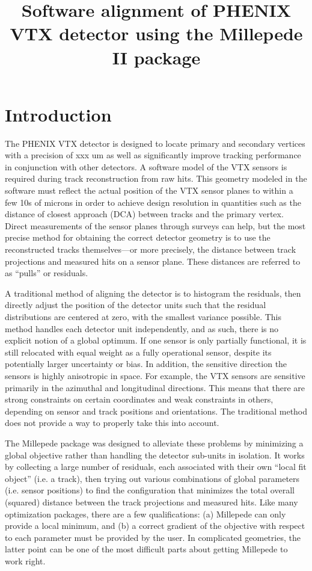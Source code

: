 \documentclass[12pt]{article}
\title{\sffamily\bfseries{Software alignment of PHENIX VTX detector using the Millepede II package}}
\author{\sffamily{Andrew Adare, Darren McGlinchey, Jin Huang}}
\date{\sffamily{\today}}
\begin{document}
\maketitle
\section{Introduction}
The PHENIX VTX detector is designed to locate primary and secondary vertices with a precision of xxx um as well as significantly improve tracking performance in conjunction with other detectors. A software model of the VTX sensors is required during track reconstruction from raw hits. This geometry modeled in the software must reflect the actual position of the VTX sensor planes to within a few 10s of microns in order to achieve design resolution in quantities such as the distance of closest approach (DCA) between tracks and the primary vertex. Direct measurements of the sensor planes through surveys can help, but the most precise method for obtaining the correct detector geometry is to use the reconstructed tracks themselves---or more precisely, the distance between track projections and measured hits on a sensor plane. These distances are referred to as ``pulls'' or residuals.

A traditional method of aligning the detector is to histogram the residuals, then directly adjust the position of the detector units such that the residual distributions are centered at zero, with the smallest variance possible. This method handles each detector unit independently, and as such, there is no explicit notion of a global optimum. If one sensor is only partially functional, it is still relocated with equal weight as a fully operational sensor, despite its potentially larger uncertainty or bias. In addition, the sensitive direction the sensors is highly anisotropic in space. For example, the VTX sensors are sensitive primarily in the azimuthal and longitudinal directions. This means that there are strong constraints on certain coordinates and weak constraints in others, depending on sensor and track positions and orientations. The traditional method does not provide a way to properly take this into account.

The Millepede package was designed to alleviate these problems by minimizing a global objective rather than handling the detector sub-units in isolation. It works by collecting a large number of residuals, each associated with their own ``local fit object'' (i.e. a track), then trying out various combinations of global parameters (i.e. sensor positions) to find the configuration that minimizes the total overall (squared) distance between the track projections and measured hits. Like many optimization packages, there are a few qualifications: (a) Millepede can only provide a local minimum, and (b) a correct gradient of the objective with respect to each parameter must be provided by the user. In complicated geometries, the latter point can be one of the most difficult parts about getting Millepede to work right.
\end{document}
